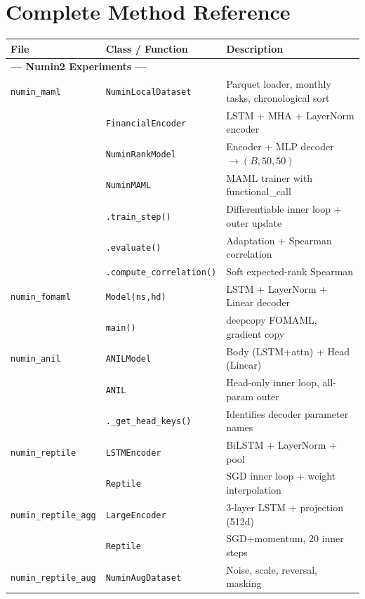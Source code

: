 \documentclass[11pt,a4paper]{article}
\begin{document}
\section{Complete Method Reference}

\begin{longtable}{p{3cm}p{4cm}p{7.5cm}}
\toprule
\textbf{File} & \textbf{Class / Function} & \textbf{Description} \\
\midrule
\endhead

\multicolumn{3}{l}{\textbf{--- Numin2 Experiments ---}} \\
\midrule
\texttt{numin\_maml} & \texttt{NuminLocalDataset} & Parquet loader, monthly tasks, chronological sort \\
 & \texttt{FinancialEncoder} & LSTM + MHA + LayerNorm encoder \\
 & \texttt{NuminRankModel} & Encoder + MLP decoder $\to (B,50,50)$ \\
 & \texttt{NuminMAML} & MAML trainer with functional\_call \\
 & \texttt{.train\_step()} & Differentiable inner loop + outer update \\
 & \texttt{.evaluate()} & Adaptation + Spearman correlation \\
 & \texttt{.compute\_correlation()} & Soft expected-rank Spearman \\
\midrule
\texttt{numin\_fomaml} & \texttt{Model(ns,hd)} & LSTM + LayerNorm + Linear decoder \\
 & \texttt{main()} & deepcopy FOMAML, gradient copy \\
\midrule
\texttt{numin\_anil} & \texttt{ANILModel} & Body (LSTM+attn) + Head (Linear) \\
 & \texttt{ANIL} & Head-only inner loop, all-param outer \\
 & \texttt{.\_get\_head\_keys()} & Identifies decoder parameter names \\
\midrule
\texttt{numin\_reptile} & \texttt{LSTMEncoder} & BiLSTM + LayerNorm + pool \\
 & \texttt{Reptile} & SGD inner loop + weight interpolation \\
\midrule
\texttt{numin\_reptile\_agg} & \texttt{LargeEncoder} & 3-layer LSTM + projection (512d) \\
 & \texttt{Reptile} & SGD+momentum, 20 inner steps \\
\midrule
\texttt{numin\_reptile\_aug} & \texttt{NuminAugDataset} & Noise, scale, reversal, masking \\

\end{longtable}
\end{document}
